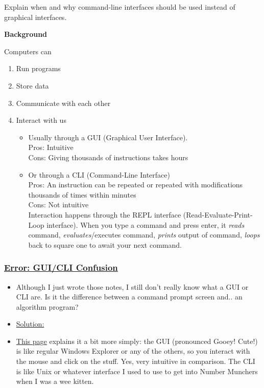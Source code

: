 \documentclass[12pt]{article}
\begin{document}
Explain when and why command-line interfaces should be used instead of graphical interfaces.
\color{black}

\vspace{1em}
\textbf{Background}

Computers can
\begin{enumerate}
    \item Run programs
    \item Store data
    \item Communicate with each other
    \item Interact with us
    \begin{itemize}
        \item Usually through a GUI (Graphical User Interface). 
        \\Pros: Intuitive
        \\Cons: Giving thousands of instructions takes hours
        \item Or through a CLI (Command-Line Interface)
        \\Pros: An instruction can be repeated or repeated with modifications thousands of times within minutes
        \\Cons: Not intuitive
        \\Interaction happens through the REPL interface (Read-Evaluate-Print-Loop interface). When you type a command and press enter, it \textit{reads} command, \textit{evaluates}/executes command, \textit{prints} output of command, \textit{loops} back to square one to await your next command.
    \end{itemize}
\end{enumerate}

\subsubsection{\texorpdfstring{\underline{Error: GUI/CLI Confusion}}{}}\label{error:er12}
\begin{itemize}
    \item Although I just wrote those notes, I still don't really know what a GUI or CLI are. Is it the difference between a command prompt screen and.. an algorithm program?
\end{itemize}
\begin{itemize}
\renewcommand{\labelitemi}{}
\item \underline{Solution:}
\renewcommand{\labelitemi}{$\bullet$}
    \item \href{https://study.com/academy/lesson/what-is-a-graphical-user-interface-gui-definition-components-examples.html}{This page} explains it a bit more simply: the GUI (pronounced Gooey! Cute!) is like regular Windows Explorer or any of the others, so you interact with the mouse and click on the stuff. Yes, very intuitive in comparison. The CLI is like Unix or whatever interface I used to use to get into Number Munchers when I was a wee kitten.
\end{itemize}
\end{document}
